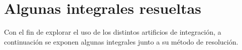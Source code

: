 \section{Algunas integrales resueltas}
Con el fin de explorar el uso de los distintos artificios de integración, a continuación se exponen algunas integrales junto a su método de resolución.

